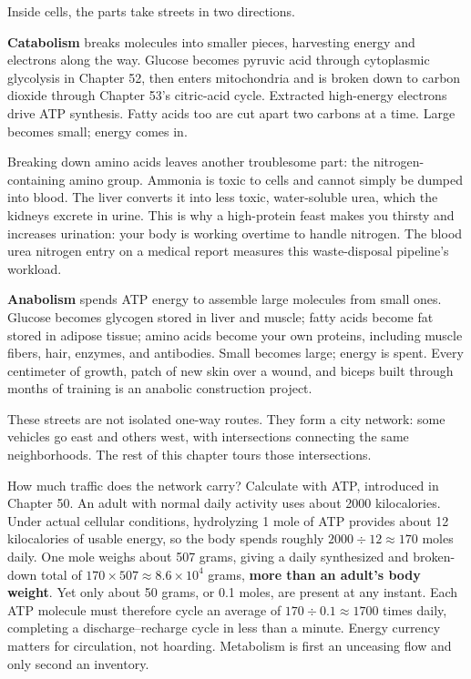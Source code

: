 Inside cells, the parts take streets in two directions.

\textbf{Catabolism} breaks molecules into smaller pieces, harvesting energy and electrons along the way. Glucose becomes pyruvic acid through cytoplasmic glycolysis in Chapter 52, then enters mitochondria and is broken down to carbon dioxide through Chapter 53's citric-acid cycle. Extracted high-energy electrons drive ATP synthesis. Fatty acids too are cut apart two carbons at a time. Large becomes small; energy comes in.

Breaking down amino acids leaves another troublesome part: the nitrogen-containing amino group. Ammonia is toxic to cells and cannot simply be dumped into blood. The liver converts it into less toxic, water-soluble urea, which the kidneys excrete in urine. This is why a high-protein feast makes you thirsty and increases urination: your body is working overtime to handle nitrogen. The blood urea nitrogen entry on a medical report measures this waste-disposal pipeline's workload.

\textbf{Anabolism} spends ATP energy to assemble large molecules from small ones. Glucose becomes glycogen stored in liver and muscle; fatty acids become fat stored in adipose tissue; amino acids become your own proteins, including muscle fibers, hair, enzymes, and antibodies. Small becomes large; energy is spent. Every centimeter of growth, patch of new skin over a wound, and biceps built through months of training is an anabolic construction project.

These streets are not isolated one-way routes. They form a city network: some vehicles go east and others west, with intersections connecting the same neighborhoods. The rest of this chapter tours those intersections.

\begin{qiaoliang}
How much traffic does the network carry? Calculate with ATP, introduced in Chapter 50. An adult with normal daily activity uses about 2000 kilocalories. Under actual cellular conditions, hydrolyzing 1 mole of ATP provides about 12 kilocalories of usable energy, so the body spends roughly $2000 \div 12 \approx 170$ moles daily. One mole weighs about 507 grams, giving a daily synthesized and broken-down total of $170 \times 507 \approx 8.6 \times 10^{4}$ grams, \textbf{more than an adult's body weight}. Yet only about 50 grams, or 0.1 moles, are present at any instant. Each ATP molecule must therefore cycle an average of $170 \div 0.1 \approx 1700$ times daily, completing a discharge--recharge cycle in less than a minute. Energy currency matters for circulation, not hoarding. Metabolism is first an unceasing flow and only second an inventory.
\end{qiaoliang}

